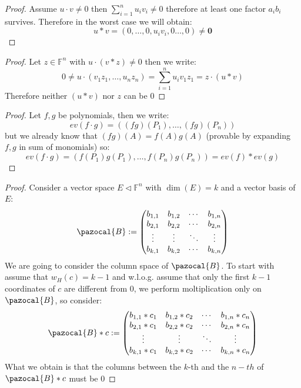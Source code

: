 \documentclass[11pt,a4paper]{report}
\theoremstyle{plain}
\theoremstyle{definition}
\begin{document}
\begin{lem-hand}[5.7.1]
\end{lem-hand}
\begin{proof}
	Assume $u\cdot v \ne 0$ then $\sum\limits_{i=1}^nu_iv_i \ne 0$ therefore at least one factor $a_ib_i$ survives. Therefore in the worst case we will obtain:
	\[
		u*v =  (0,\ldots,0,u_iv_i,0\ldots,0)\ne \textbf{0}	
	\]
\end{proof}
\begin{ex-hand}[5.8.15]
\end{ex-hand}
\begin{proof}
	Let $z \in \mathbb{F}^n$ with $u\cdot(v*z) \ne 0$ then we write:
	\[
		0 \ne u \cdot (v_1z_1,\ldots,u_nz_n) = \sum\limits_{i=1}^nu_iv_1z_1 = z\cdot(u*v)	
	\]
	Therefore neither $(u*v)$ nor $z$ can be $0$
\end{proof}
\begin{lem-hand}[5.7.2]
\end{lem-hand}
\begin{proof}
	Let $f,g$ be polynomials, then we write:
	\[
		ev(f\cdot g) = ((fg)(P_1),\ldots,(fg)(P_n))	
	\]
	but we already know that $(fg)(A) = f(A)g(A)$ (provable by expanding $f,g$ in sum of monomials) so:
	\[
			ev(f\cdot g) = (f(P_1)g(P_1),\ldots,f(P_n)g(P_n)) = ev(f)*ev(g)
	\]
\end{proof}

\begin{lem-hand}[5.7.3(STUCK)]
\end{lem-hand}
\begin{proof}
	Consider a vector space $E \lhd \mathbb{F}^n$ with $\dim(E) = k$ and a vector basis of $E$:
	\[	
		\pazocal{B} := \begin{pmatrix}
  b_{1,1}  & b_{1,2} & \cdots & b_{1,n} \\
  b_{2,1} & b_{2,2} & \cdots & b_{2,n}\\
  \vdots &\vdots& \ddots & \vdots  \\
  b_{k,1} & b_{k,2} & \cdots & b_{k,n} 
 \end{pmatrix}	
	\] 
	We are going to consider the column space of $\pazocal{B}$. To start with assume that $w_H(c) = k-1$ and w.l.o.g. assume that only the first $k-1$ coordinates of $c$ are different from $0$, we perform moltiplication only on $\pazocal{B}$, so consider:
	\[
		\pazocal{B}*c := \begin{pmatrix}
  b_{1,1}*c_1  & b_{1,2}*c_2 & \cdots & b_{1,n}*c_n \\
  b_{2,1}*c_1 & b_{2,2}*c_2 & \cdots & b_{2,n}*c_n\\
  \vdots &\vdots& \ddots & \vdots  \\
  b_{k,1}*c_1 & b_{k,2}*c_2 & \cdots & b_{k,n}*c_n
 \end{pmatrix}
	\]
	What we obtain is that the columns between the $k$-th and the $n-th$ of $\pazocal{B}*c$ must be $0$
\end{proof}
\end{document}
